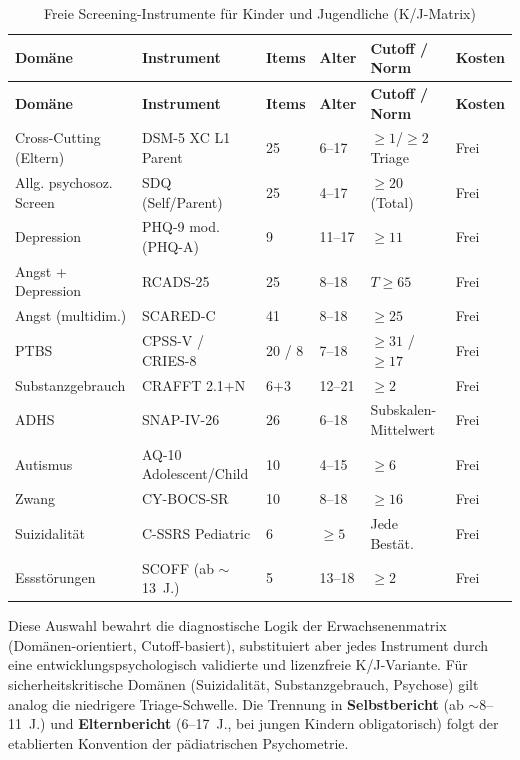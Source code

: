 \documentclass[11pt,a4paper]{article}
\begin{document}
\footnotesize
\begin{longtable}{@{}L{2.4cm}L{2.4cm}L{0.9cm}L{1.5cm}L{2.0cm}L{1.5cm}@{}}
\caption{Freie Screening-Instrumente f\"ur Kinder und Jugendliche (K/J-Matrix)} \label{tab:instrumente_kj} \\
\toprule
\textbf{Dom\"ane} & \textbf{Instrument} & \textbf{Items} & \textbf{Alter} & \textbf{Cutoff / Norm} & \textbf{Kosten} \\
\midrule
\endfirsthead
\toprule
\textbf{Dom\"ane} & \textbf{Instrument} & \textbf{Items} & \textbf{Alter} & \textbf{Cutoff / Norm} & \textbf{Kosten} \\
\midrule
\endhead
Cross-Cutting (Eltern) & DSM-5 XC L1 Parent & 25 & 6--17 & $\geq 1$/$\geq 2$ Triage & Frei \\
\addlinespace
Allg. psychosoz. Screen & SDQ (Self/Parent) & 25 & 4--17 & $\geq 20$ (Total) & Frei \\
\addlinespace
Depression & PHQ-9 mod. (PHQ-A) & 9 & 11--17 & $\geq 11$ & Frei \\
\addlinespace
Angst + Depression & RCADS-25 & 25 & 8--18 & $T \geq 65$ & Frei \\
\addlinespace
Angst (multidim.) & SCARED-C & 41 & 8--18 & $\geq 25$ & Frei \\
\addlinespace
PTBS & CPSS-V / CRIES-8 & 20 / 8 & 7--18 & $\geq 31$ / $\geq 17$ & Frei \\
\addlinespace
Substanzgebrauch & CRAFFT 2.1+N & 6+3 & 12--21 & $\geq 2$ & Frei \\
\addlinespace
ADHS & SNAP-IV-26 & 26 & 6--18 & Subskalen-Mittelwert & Frei \\
\addlinespace
Autismus & AQ-10 Adolescent/Child & 10 & 4--15 & $\geq 6$ & Frei \\
\addlinespace
Zwang & CY-BOCS-SR & 10 & 8--18 & $\geq 16$ & Frei \\
\addlinespace
Suizidalit\"at & C-SSRS Pediatric & 6 & $\geq 5$ & Jede Best\"at. & Frei \\
\addlinespace
Essst\"orungen & SCOFF (ab $\sim$13~J.) & 5 & 13--18 & $\geq 2$ & Frei \\
\bottomrule
\end{longtable}
\normalsize

Diese Auswahl bewahrt die diagnostische Logik der Erwachsenenmatrix (Dom\"anen-orientiert, Cutoff-basiert), substituiert aber jedes Instrument durch eine entwicklungspsychologisch validierte und lizenzfreie K/J-Variante. F\"ur sicherheitskritische Dom\"anen (Suizidalit\"at, Substanzgebrauch, Psychose) gilt analog die niedrigere Triage-Schwelle. Die Trennung in \textbf{Selbstbericht} (ab $\sim$8--11~J.) und \textbf{Elternbericht} (6--17~J., bei jungen Kindern obligatorisch) folgt der etablierten Konvention der p\"adiatrischen Psychometrie.
\end{document}
